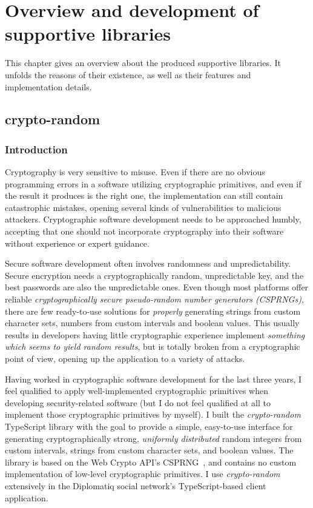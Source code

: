 \chapter{Overview and development of supportive libraries}
\label{chapter:libraries}

This chapter gives an overview about the produced supportive libraries. It unfolds the reasons of their existence, as well as their features and implementation details.

\section{crypto-random}

\subsection{Introduction}

Cryptography is very sensitive to misuse. Even if there are no obvious programming errors in a software utilizing cryptographic primitives, and even if the result it produces is the right one, the implementation can still contain catastrophic mistakes, opening several kinds of vulnerabilities to malicious attackers. Cryptographic software development needs to be approached humbly, accepting that one should not incorporate cryptography into their software without experience or expert guidance.

Secure software development often involves randomness and unpredictability. Secure encryption needs a cryptographically random, unpredictable key, and the best passwords are also the unpredictable ones. Even though most platforms offer reliable \emph{cryptographically secure pseudo-random number generators (CSPRNGs)}, there are few ready-to-use solutions for \emph{properly} generating strings from custom character sets, numbers from custom intervals and boolean values. This usually results in developers having little cryptographic experience implement \emph{something which seems to yield random results}, but is totally broken from a cryptographic point of view, opening up the application to a variety of attacks.

Having worked in cryptographic software development for the last three years, I feel qualified to apply well-implemented cryptographic primitives when developing security-related software (but I do not feel qualified at all to implement those cryptographic primitives by myself). I built the \emph{crypto-random} TypeScript library with the goal to provide a simple, easy-to-use interface for generating cryptographically strong, \emph{uniformly distributed} random integers from custom intervals, strings from custom character sets, and boolean values. The library is based on the Web Crypto API's CSPRNG~\cite{getrandomvalues}, and contains no custom implementation of low-level cryptographic primitives. I use \emph{crypto-random} extensively in the Diplomatiq social network's TypeScript-based client application.

